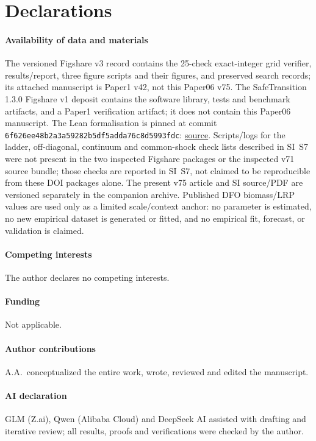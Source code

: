 \section*{Declarations}
\paragraph{Availability of data and materials} The versioned Figshare v3 record \citep{Abaee2026code} contains the 25-check exact-integer grid verifier, results/report, three figure scripts and their figures, and preserved search records; its attached manuscript is Paper1 v42, not this Paper06 v75. The SafeTransition 1.3.0 Figshare v1 deposit \citep{Abaee2026software} contains the software library, tests and benchmark artifacts, and a Paper1 verification artifact; it does not contain this Paper06 manuscript. The Lean formalisation is pinned at commit \texttt{6f626ee48b2a3a59282b5df5adda76c8d5993fdc}: \href{https://github.com/MIKEAA2020/general-sustainability/blob/6f626ee48b2a3a59282b5df5adda76c8d5993fdc/lean/Formalizations/P1_AssessmentSeparation.lean}{source}. Scripts/logs for the ladder, off-diagonal, continuum and common-shock check lists described in SI~S7 were not present in the two inspected Figshare packages or the inspected v71 source bundle; those checks are reported in SI~S7, not claimed to be reproducible from these DOI packages alone. The present v75 article and SI source/PDF are versioned separately in the companion archive. Published DFO biomass/LRP values are used only as a limited scale/context anchor: no parameter is estimated, no new empirical dataset is generated or fitted, and no empirical fit, forecast, or validation is claimed.
\paragraph{Competing interests} The author declares no competing interests.
\paragraph{Funding} Not applicable.
\paragraph{Author contributions} A.A.\ conceptualized the entire work, wrote, reviewed and edited the manuscript.
\paragraph{AI declaration} GLM (Z.ai), Qwen (Alibaba Cloud) and DeepSeek AI assisted with drafting and iterative review; all results, proofs and verifications were checked by the author.

